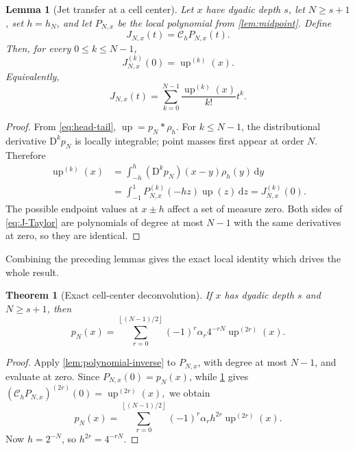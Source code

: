\documentclass[11pt]{article}
\newtheorem{theorem}{Theorem}[section]
\newtheorem{lemma}[lemma]{Lemma}
\theoremstyle{definition}
\theoremstyle{remark}
\newcommand{\dd}{\,\mathrm d}
\newcommand{\rv}{\operatorname{up}}
\newcommand{\D}{\mathrm D}
\newcommand{\floor}[1]{\left\lfloor #1\right\rfloor}
\begin{document}
\begin{lemma}[Jet transfer at a cell center]
\label{lem:jet-transfer}
Let \(x\) have dyadic depth \(s\), let \(N\ge s+1\), set \(h=h_N\), and let
\(P_{N,x}\) be the local polynomial from \cref{lem:midpoint}.  Define
\begin{equation}
 J_{N,x}(t)=\mathcal C_hP_{N,x}(t).
 \label{eq:J-polynomial}
\end{equation}
Then, for every \(0\le k\le N-1\),
\begin{equation}
 J_{N,x}^{(k)}(0)=\rv^{(k)}(x).
 \label{eq:jet-match}
\end{equation}
Equivalently,
\begin{equation}
 J_{N,x}(t)=\sum_{k=0}^{N-1}\frac{\rv^{(k)}(x)}{k!}t^k.
 \label{eq:J-Taylor}
\end{equation}
\end{lemma}

\begin{proof}
From \cref{eq:head-tail},
\(
 \rv=p_N*\rho_h.
\)
For \(k\le N-1\), the distributional derivative \(\D^kp_N\) is locally
integrable; point masses first appear at order \(N\).  Therefore
\begin{align*}
 \rv^{(k)}(x)
 &=\int_{-h}^{h}(\D^kp_N)(x-y)\rho_h(y)\dd y\\
 &=\int_{-1}^{1}P_{N,x}^{(k)}(-hz)\rv(z)\dd z
  =J_{N,x}^{(k)}(0).
\end{align*}
The possible endpoint values at \(x\pm h\) affect a set of measure zero.  Both
sides of \cref{eq:J-Taylor} are polynomials of degree at most \(N-1\) with the
same derivatives at zero, so they are identical.
\end{proof}

Combining the preceding lemmas gives the exact local identity which drives the
whole result.

\begin{theorem}[Exact cell-center deconvolution]
\label{thm:cell-deconvolution}
If \(x\) has dyadic depth \(s\) and \(N\ge s+1\), then
\begin{equation}
 \boxed{
 p_N(x)=\sum_{r=0}^{\floor{(N-1)/2}}
 (-1)^r\alpha_r4^{-rN}\rv^{(2r)}(x).}
 \label{eq:cell-deconvolution}
\end{equation}
\end{theorem}

\begin{proof}
Apply \cref{lem:polynomial-inverse} to \(P_{N,x}\), with degree at most
\(N-1\), and evaluate at zero.  Since \(P_{N,x}(0)=p_N(x)\), while
\cref{lem:jet-transfer} gives
\(
 (\mathcal C_hP_{N,x})^{(2r)}(0)=\rv^{(2r)}(x),
\)
we obtain
\[
 p_N(x)=\sum_{r=0}^{\floor{(N-1)/2}}
 (-1)^r\alpha_r h^{2r}\rv^{(2r)}(x).
\]
Now \(h=2^{-N}\), so \(h^{2r}=4^{-rN}\).
\end{proof}
\end{document}

